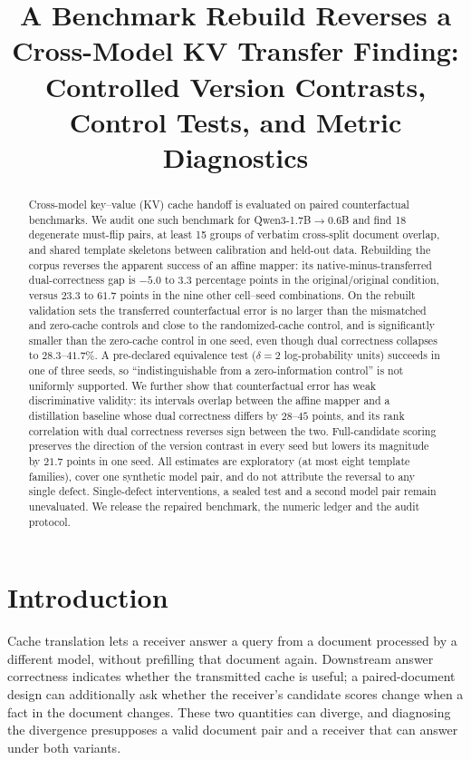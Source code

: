 \documentclass[10pt]{article}
\title{A Benchmark Rebuild Reverses a Cross-Model KV Transfer Finding:\\
       Controlled Version Contrasts, Control Tests, and Metric Diagnostics}
\author{}
\begin{document}
\maketitle

\begin{abstract}
Cross-model key--value (KV) cache handoff is evaluated on paired counterfactual benchmarks. We audit one such benchmark for Qwen3-1.7B$\to$0.6B and find 18 degenerate must-flip pairs, at least 15 groups of verbatim cross-split document overlap, and shared template skeletons between calibration and held-out data. Rebuilding the corpus reverses the apparent success of an affine mapper: its native-minus-transferred dual-correctness gap is $-5.0$ to $3.3$ percentage points in the original/original condition, versus $23.3$ to $61.7$ points in the nine other cell--seed combinations. On the rebuilt validation sets the transferred counterfactual error is no larger than the mismatched and zero-cache controls and close to the randomized-cache control, and is significantly smaller than the zero-cache control in one seed, even though dual correctness collapses to $28.3$--$41.7\%$. A pre-declared equivalence test ($\delta=2$ log-probability units) succeeds in one of three seeds, so ``indistinguishable from a zero-information control'' is not uniformly supported. We further show that counterfactual error has weak discriminative validity: its intervals overlap between the affine mapper and a distillation baseline whose dual correctness differs by $28$--$45$ points, and its rank correlation with dual correctness reverses sign between the two. Full-candidate scoring preserves the direction of the version contrast in every seed but lowers its magnitude by $21.7$ points in one seed. All estimates are exploratory (at most eight template families), cover one synthetic model pair, and do not attribute the reversal to any single defect. Single-defect interventions, a sealed test and a second model pair remain unevaluated. We release the repaired benchmark, the numeric ledger and the audit protocol.
\end{abstract}

\section{Introduction}

Cache translation lets a receiver answer a query from a document processed by a different model, without prefilling that document again. Downstream answer correctness indicates whether the transmitted cache is useful; a paired-document design can additionally ask whether the receiver's candidate scores change when a fact in the document changes. These two quantities can diverge, and diagnosing the divergence presupposes a valid document pair and a receiver that can answer under both variants.
\end{document}
